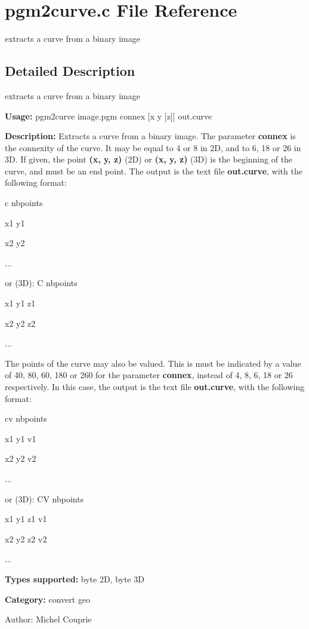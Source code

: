 \section{pgm2curve.c File Reference}
\label{pgm2curve_8c}
extracts a curve from a binary image  




\label{_details}
\subsection{Detailed Description}
extracts a curve from a binary image 

{\bf Usage:} pgm2curve image.pgm connex [x y [z]] out.curve

{\bf Description:} Extracts a curve from a binary image. The parameter {\bf connex} is the connexity of the curve. It may be equal to 4 or 8 in 2D, and to 6, 18 or 26 in 3D. If given, the point {\bf (x, y, z)} (2D) or {\bf (x, y, z)} (3D) is the beginning of the curve, and must be an end point. The output is the text file {\bf out.curve}, with the following format:\par
 c nbpoints\par
 x1 y1\par
 x2 y2\par
 ...\par
 or (3D): C nbpoints\par
 x1 y1 z1\par
 x2 y2 z2\par
 ...\par


The points of the curve may also be valued. This is must be indicated by a value of 40, 80, 60, 180 or 260 for the parameter {\bf connex}, instead of 4, 8, 6, 18 or 26 respectively. In this case, the output is the text file {\bf out.curve}, with the following format:\par
 cv nbpoints\par
 x1 y1 v1\par
 x2 y2 v2\par
 ...\par
 or (3D): CV nbpoints\par
 x1 y1 z1 v1\par
 x2 y2 z2 v2\par
 ...\par


{\bf Types supported:} byte 2D, byte 3D

{\bf Category:} convert geo

\begin{Desc}
\item[Author:]Michel Couprie \end{Desc}

